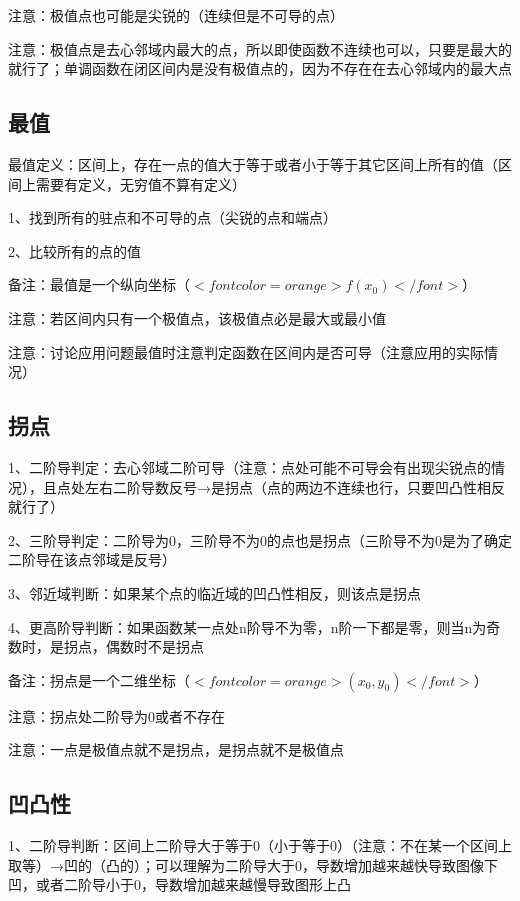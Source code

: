 注意：极值点也可能是尖锐的（连续但是不可导的点）

注意：极值点是去心邻域内最大的点，所以即使函数不连续也可以，只要是最大的就行了；单调函数在闭区间内是没有极值点的，因为不存在在去心邻域内的最大点



\subsection{最值}

最值定义：区间上，存在一点的值大于等于或者小于等于其它区间上所有的值（区间上需要有定义，无穷值不算有定义）

1、找到所有的驻点和不可导的点（尖锐的点和端点）

2、比较所有的点的值

备注：最值是一个纵向坐标（$ <font color=orange>f(x_0)</font> $）

注意：若区间内只有一个极值点，该极值点必是最大或最小值

注意：讨论应用问题最值时注意判定函数在区间内是否可导（注意应用的实际情况）



\subsection{拐点}

1、二阶导判定：去心邻域二阶可导（注意：点处可能不可导会有出现尖锐点的情况），且点处左右二阶导数反号→是拐点（点的两边不连续也行，只要凹凸性相反就行了）

2、三阶导判定：二阶导为0，三阶导不为0的点也是拐点（三阶导不为0是为了确定二阶导在该点邻域是反号）

3、邻近域判断：如果某个点的临近域的凹凸性相反，则该点是拐点

4、更高阶导判断：如果函数某一点处n阶导不为零，n阶一下都是零，则当n为奇数时，是拐点，偶数时不是拐点

备注：拐点是一个二维坐标（$ <font color=orange>(x_0,y_0)</font> $）

注意：拐点处二阶导为0或者不存在

注意：一点是极值点就不是拐点，是拐点就不是极值点



\subsection{凹凸性}

1、二阶导判断：区间上二阶导大于等于0（小于等于0）（注意：不在某一个区间上取等）→凹的（凸的）；可以理解为二阶导大于0，导数增加越来越快导致图像下凹，或者二阶导小于0，导数增加越来越慢导致图形上凸

